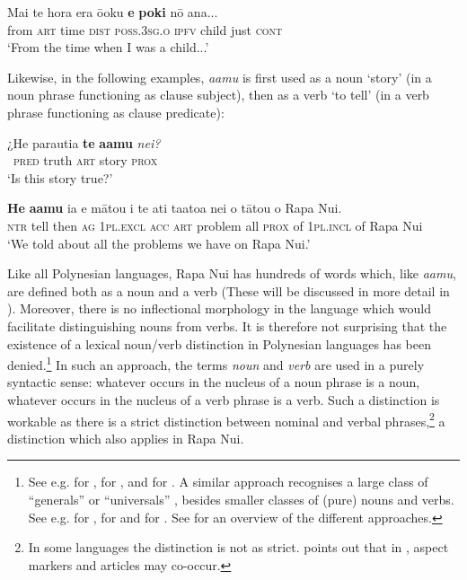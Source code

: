 \ea\label{ex:3.2}
\gll Mai te hora era ō{\ꞌ}oku \textbf{e} \textbf{poki} nō {\ꞌ}ana... \\
from \textsc{art} time \textsc{dist} \textsc{poss.3sg.o} \textsc{ipfv} child just \textsc{cont} \\
\glt
‘From the time when I was a child...’ \textstyleExampleref{[R539-1.614]}
\z

Likewise, in the following examples, \textit{\mbox{{\ꞌ}a{\ꞌ}amu}} is first used as a noun ‘story’ (in a noun phrase functioning as clause subject), then as a verb ‘to tell’ (in a verb phrase functioning as clause predicate):

\ea\label{ex:3.3}
\gll ¿He parauti{\ꞌ}a \textbf{te} \textbf{{\ꞌ}a{\ꞌ}amu} \textit{nei?}\\
~\textsc{pred} truth \textsc{art} story \textsc{prox}\\

\glt 
‘Is this story true?’ \textstyleExampleref{ [R616.608]} 
\z

\ea\label{ex:3.4}
\gll \textbf{He} \textbf{{\ꞌ}a{\ꞌ}amu} ia e mātou i te {\ꞌ}ati ta{\ꞌ}ato{\ꞌ}a nei o tātou o Rapa Nui.\\
\textsc{ntr} tell then \textsc{ag} \textsc{1pl.excl} \textsc{acc} \textsc{art} problem all \textsc{prox} of \textsc{1pl.incl} of Rapa Nui\\

\glt
‘We told about all the problems we have on Rapa Nui.’ \textstyleExampleref{[R649.238]} 
\z

Like all Polynesian languages, Rapa Nui has hundreds of words which, like \textit{\mbox{{\ꞌ}a{\ꞌ}amu}}, are defined both as a noun and a verb (These will be discussed in more detail in ). Moreover, there is no inflectional morphology in the language which would facilitate distinguishing nouns from verbs. It is therefore not surprising that the existence of a lexical noun/verb distinction in Polynesian languages has been denied.\footnote{\label{fn:89}See e.g. \citet{MoselHovdhaugen1992} for , \citet{LazardPeltzer1991,LazardPeltzer2000} for , and \citet{ElbertPukui1979} for . A similar approach recognises a large class of “generals” \citep{Biggs1961} or “universals” \citep{Biggs1973}, besides smaller classes of (pure) nouns and verbs. See e.g. \citet{Buse1963Verbal,Buse1965} for , \citet{Tchekhoff1979} for  and \citet{Biggs1961,Biggs1973} for . See \citet{Vonen2000} for an overview of the different approaches.}  In such an approach, the terms \textit{noun} and \textit{verb} are used in a purely syntactic sense: whatever occurs in the nucleus of a noun phrase is a noun, whatever occurs in the nucleus of a verb phrase is a verb. Such a distinction is workable as there is a strict distinction between nominal and verbal phrases,\footnote{\label{fn:90}In some languages the distinction is not as strict. \citet[168]{Moyse-Faurie2005} points out that in , aspect markers and articles may co-occur.} a distinction which also applies in Rapa Nui.

